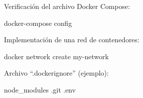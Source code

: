 \documentclass[
  a4paper,
  DIV=11,
  numbers=noendperiod,
  onepage,
  openany]{scrreprt}
\newenvironment{Shaded}{\begin{snugshade}}{\end{snugshade}}
\newcommand{\ExtensionTok}[1]{\textcolor[rgb]{0.00,0.23,0.31}{#1}}
\newcommand{\NormalTok}[1]{\textcolor[rgb]{0.00,0.23,0.31}{#1}}
\begin{document}
Verificación del archivo Docker Compose:

\begin{Shaded}
\begin{Highlighting}[]
\ExtensionTok{docker{-}compose}\NormalTok{ config}
\end{Highlighting}
\end{Shaded}

Implementación de una red de contenedores:

\begin{Shaded}
\begin{Highlighting}[]
\ExtensionTok{docker}\NormalTok{ network create my{-}network}
\end{Highlighting}
\end{Shaded}

Archivo ``.dockerignore'' (ejemplo):

\begin{Shaded}
\begin{Highlighting}[]
\ExtensionTok{node\_modules}
\ExtensionTok{.git}
\ExtensionTok{.env}
\end{Highlighting}
\end{Shaded}
\end{document}
